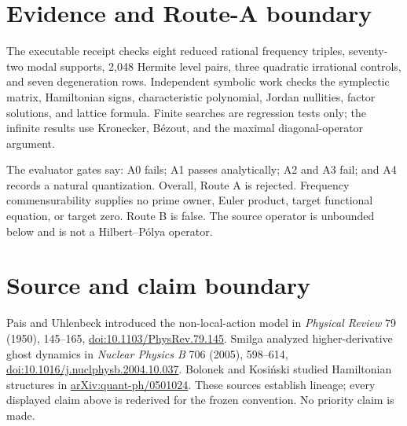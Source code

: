 \documentclass[10pt]{article}
\begin{document}
\section{Evidence and Route-A boundary}
The executable receipt checks eight reduced rational frequency triples,
seventy-two modal supports, 2,048 Hermite level pairs, three quadratic
irrational controls, and seven degeneration rows.  Independent symbolic work
checks the symplectic matrix, Hamiltonian signs, characteristic polynomial,
Jordan nullities, factor solutions, and lattice formula.  Finite searches are
regression tests only; the infinite results use Kronecker, Bézout, and the
maximal diagonal-operator argument.

The evaluator gates say: A0 fails; A1 passes analytically; A2 and A3 fail;
and A4 records a natural quantization.  Overall, Route A is rejected.
Frequency commensurability supplies no prime owner,
Euler product, target functional equation, or target zero.  Route B is false.
The source operator is unbounded below and is not a Hilbert--P\'olya operator.
\fi

\section*{Source and claim boundary}
Pais and Uhlenbeck introduced the non-local-action model in
\emph{Physical Review} 79 (1950), 145--165,
\href{https://doi.org/10.1103/PhysRev.79.145}{doi:10.1103/PhysRev.79.145}.
Smilga analyzed higher-derivative ghost dynamics in \emph{Nuclear Physics B}
706 (2005), 598--614,
\href{https://doi.org/10.1016/j.nuclphysb.2004.10.037}{doi:10.1016/j.nuclphysb.2004.10.037}.
Bolonek and Kosi\'nski studied Hamiltonian structures in
\href{https://arxiv.org/abs/quant-ph/0501024}{arXiv:quant-ph/0501024}.
These sources establish lineage; every displayed claim above is rederived for
the frozen convention.  No priority claim is made.
\end{document}
